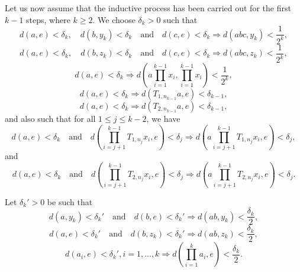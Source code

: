 \documentclass[12pt,a4paper]{amsart}
\theoremstyle{plain}
\theoremstyle{definition}
\theoremstyle{remark}
\theoremstyle{fact}
\begin{document}
    Let us now assume that the inductive process has been carried out for the first $k-1$ steps, where $k \geq 2$. We choose $\delta_k>0$ such that
    \begin{equation}\label{eq16}
        d(a,e)<\delta_k, \quad d(b,y_k)<\delta_k \quad \text{and} \quad d(c,e)<\delta_k \Rightarrow d(abc,y_k)<\frac{1}{2^k},
    \end{equation}
    \begin{equation}\label{eq17}
        d(a,e)<\delta_k, \quad d(b,z_k)<\delta_k \quad \text{and} \quad d(c,e)<\delta_k \Rightarrow d(abc,z_k)<\frac{1}{2^k},
    \end{equation}
    \begin{equation}\label{eq18}
    d(a,e)<\delta_k \Rightarrow d(a\prod_{i=1}^{k-1}x_i, \prod_{i=1}^{k-1}x_i)<\frac{1}{2^k},
    \end{equation}
    \begin{equation}\label{eq19}
        d(a,e)<\delta_k \Rightarrow d(T_{1, n_{k-1}}a,e)<\delta_{k-1}, 
    \end{equation}
    \begin{equation}\label{eq20}
        d(a,e)<\delta_{k} \Rightarrow d(T_{2, n_{k-1}}a,e)<\delta_{k-1},
    \end{equation}
    and also such that for all $1\leq j\leq k-2$, we have
    \begin{equation}\label{eq21}
        d(a,e)<\delta_k \quad \text{and} \quad d(\prod_{i=j+1}^{k-1}T_{1, n_j}x_i,e)<\delta_j \Rightarrow d(a\prod_{i=j+1}^{k-1}T_{1, n_j}x_i,e)<\delta_j, 
    \end{equation}
    and
    \begin{equation}\label{eq22}
        d(a,e)<\delta_k \quad \text{and} \quad d(\prod_{i=j+1}^{k-1}T_{2, n_j}x_i,e)<\delta_j \Rightarrow d(a\prod_{i=j+1}^{k-1}T_{2, n_j}x_i,e)<\delta_j.
    \end{equation}
    

    Let $\delta_k'>0$ be such that
    \begin{equation}\label{eq23}
        d(a,y_k)<\delta_k' \quad \text{and} \quad d(b,e)<\delta_k' \Rightarrow d(ab,y_k)<\frac{\delta_k}{2},
    \end{equation}
    \begin{equation}\label{eq24}
        d(a,e)<\delta_k' \quad \text{and} \quad d(b,z_k)<\delta_k' \Rightarrow d(ab,z_k)<\frac{\delta_k}{2},
    \end{equation}
    \begin{equation}\label{eq25}
        d(a_i,e)<\delta_k', i=1,\dots ,k \Rightarrow d(\prod_{i=1}^{k}a_i,e)<\frac{\delta_k}{2}.
    \end{equation}
\end{document}
